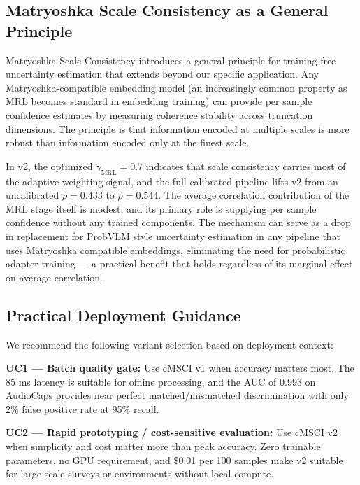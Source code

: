 \documentclass[a4paper,fleqn]{cas-sc}
\begin{document}
\begin{itemize}
\subsection{Matryoshka Scale Consistency as a General Principle}\label{sec:matryoshka-discussion}

Matryoshka Scale Consistency introduces a general principle for training free uncertainty estimation that extends beyond our specific application. Any Matryoshka-compatible embedding model (an increasingly common property as MRL becomes standard in embedding training) can provide per sample confidence estimates by measuring coherence stability across truncation dimensions. The principle is that information encoded at multiple scales is more robust than information encoded only at the finest scale.

In v2, the optimized $\gamma_{\mathrm{MRL}} = 0.7$ indicates that scale consistency carries most of the adaptive weighting signal, and the full calibrated pipeline lifts v2 from an uncalibrated $\rho = 0.433$ to $\rho = 0.544$. The average correlation contribution of the MRL stage itself is modest, and its primary role is supplying per sample confidence without any trained components. The mechanism can serve as a drop in replacement for ProbVLM style uncertainty estimation in any pipeline that uses Matryoshka compatible embeddings, eliminating the need for probabilistic adapter training — a practical benefit that holds regardless of its marginal effect on average correlation.

\subsection{Practical Deployment Guidance}\label{sec:deployment-guidance}

We recommend the following variant selection based on deployment context:

\textbf{UC1 --- Batch quality gate:} Use cMSCI v1 when accuracy matters most. The 85 ms latency is suitable for offline processing, and the AUC of 0.993 on AudioCaps provides near perfect matched/mismatched discrimination with only 2\% false positive rate at 95\% recall.

\textbf{UC2 --- Rapid prototyping / cost-sensitive evaluation:} Use cMSCI v2 when simplicity and cost matter more than peak accuracy. Zero trainable parameters, no GPU requirement, and \$0.01 per 100 samples make v2 suitable for large scale surveys or environments without local compute.


\end{itemize}
\end{document}
